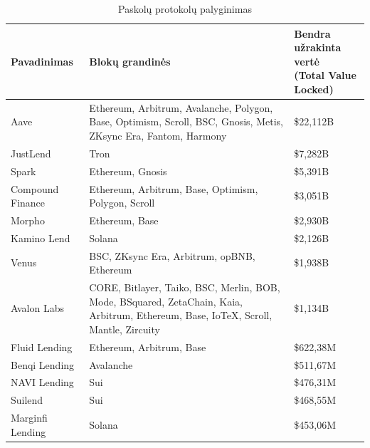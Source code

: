 \documentclass[]{VUMIFTemplateClass}
\begin{document}
\begin{table}[H]
  \centering
  \caption{Paskolų protokolų palyginimas \cite{LikvidacijuProtokolai}}
  \begin{tabular}{|l|p{7cm}|p{5cm}|}
  \hline
  \textbf{Pavadinimas}       & \textbf{Blokų grandinės}                                                                 & \makecell{\textbf{Bendra užrakinta vertė} \\ \textbf{(Total Value Locked)}} \\ \hline
  Aave                      & Ethereum, Arbitrum, Avalanche, Polygon, Base, Optimism, Scroll, BSC, Gnosis, Metis, ZKsync Era, Fantom, Harmony & \$22,112B \\ \hline
  JustLend                  & Tron                                                                                  & \$7,282B  \\ \hline
  Spark                     & Ethereum, Gnosis                                                                      & \$5,391B  \\ \hline
  Compound Finance          & Ethereum, Arbitrum, Base, Optimism, Polygon, Scroll                                   & \$3,051B  \\ \hline
  Morpho                    & Ethereum, Base                                                                        & \$2,930B  \\ \hline
  Kamino Lend               & Solana                                                                                & \$2,126B  \\ \hline
  Venus                     & BSC, ZKsync Era, Arbitrum, opBNB, Ethereum                                            & \$1,938B  \\ \hline
  Avalon Labs               & CORE, Bitlayer, Taiko, BSC, Merlin, BOB, Mode, BSquared, ZetaChain, Kaia, Arbitrum, Ethereum, Base, IoTeX, Scroll, Mantle, Zircuity & \$1,134B  \\ \hline
  Fluid Lending             & Ethereum, Arbitrum, Base                                                              & \$622,38M \\ \hline
  Benqi Lending             & Avalanche                                                                             & \$511,67M \\ \hline
  NAVI Lending              & Sui                                                                                   & \$476,31M \\ \hline
  Suilend                   & Sui                                                                                   & \$468,55M \\ \hline
  Marginfi Lending          & Solana                                                                                & \$453,06M \\ \hline
  \end{tabular}
  \label{tab:sample_table}
\end{table}
\end{document}
